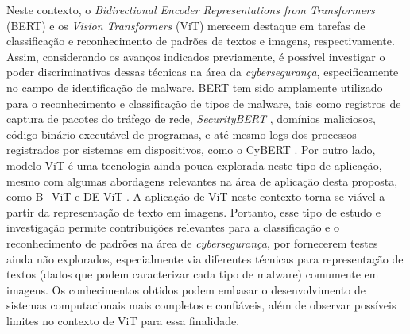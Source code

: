    Neste contexto, o \textit{Bidirectional Encoder Representations from Transformers} (BERT) e os \textit{Vision Transformers} (ViT) merecem destaque em tarefas de classificação e reconhecimento de padrões de textos e imagens, respectivamente. Assim, considerando os avanços indicados previamente, é possível investigar o poder discriminativos dessas técnicas na área da \textit{cybersegurança}, especificamente no campo de identificação de malware. BERT tem sido amplamente utilizado para o reconhecimento e classificação de tipos de malware, tais como registros de captura de pacotes do tráfego de rede, \textit{SecurityBERT} \cite{ferrag2024revolutionizing}, domínios maliciosos, código binário executável de programas, e até mesmo logs dos processos registrados por sistemas em dispositivos, como o CyBERT \cite{ranade2021cybert}. Por outro lado, modelo ViT é uma tecnologia ainda pouca explorada neste tipo de aplicação, mesmo com algumas abordagens relevantes na área de aplicação desta proposta, como B\_ViT \cite{belal2023global} e DE-ViT \cite{he2024network}. A aplicação de ViT neste contexto torna-se viável a partir da representação de texto em imagens. Portanto, esse tipo de estudo e investigação permite contribuições relevantes para a classificação e o reconhecimento de padrões na área de \textit{cybersegurança}, por fornecerem testes ainda não explorados, especialmente via diferentes técnicas para representação de textos (dados que podem caracterizar cada tipo de malware) comumente  em imagens. Os conhecimentos obtidos podem embasar o desenvolvimento de sistemas computacionais mais completos e confiáveis, além de observar possíveis limites no contexto de ViT para essa finalidade.
